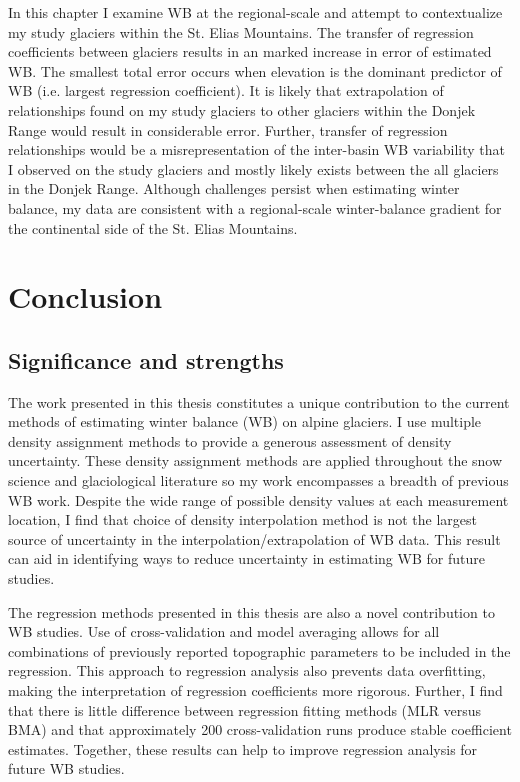 \documentclass{sfuthesis}
\begin{document}
In this chapter I examine WB at the regional-scale and attempt to contextualize my study glaciers within the St. Elias Mountains. The transfer of regression coefficients between glaciers results in an marked increase in error of estimated WB. The smallest total error occurs when elevation is the dominant predictor of WB (i.e. largest regression coefficient). It is likely that extrapolation of relationships found on my study glaciers to other glaciers within the Donjek Range would result in considerable error. Further, transfer of regression relationships would be a misrepresentation of the inter-basin WB variability that I observed on the study glaciers and mostly likely exists between the all glaciers in the Donjek Range. Although challenges persist when estimating winter balance, my data are consistent with a regional-scale winter-balance gradient for the continental side of the St. Elias Mountains. 


\chapter{Conclusion}

\section{Significance and strengths}

The work presented in this thesis constitutes a unique contribution to the current methods of estimating winter balance (WB) on alpine glaciers. I use multiple density assignment methods to provide a generous assessment of density uncertainty. These density assignment methods are applied throughout the snow science and glaciological literature so my work encompasses a breadth of previous WB work. Despite the wide range of possible density values at each measurement location, I find that choice of density interpolation method is not the largest source of uncertainty in the interpolation/extrapolation of WB data. This result can aid in identifying ways to reduce uncertainty in estimating WB for future studies. 

The regression methods presented in this thesis are also a novel contribution to WB studies. Use of cross-validation and model averaging allows for all combinations of previously reported topographic parameters to be included in the regression. This approach to regression analysis also prevents data overfitting, making the interpretation of regression coefficients more rigorous. Further, I find that there is little difference between regression fitting methods (MLR versus BMA) and that approximately 200 cross-validation runs produce stable coefficient estimates. Together, these results can help to improve regression analysis for future WB studies. 
\end{document}
